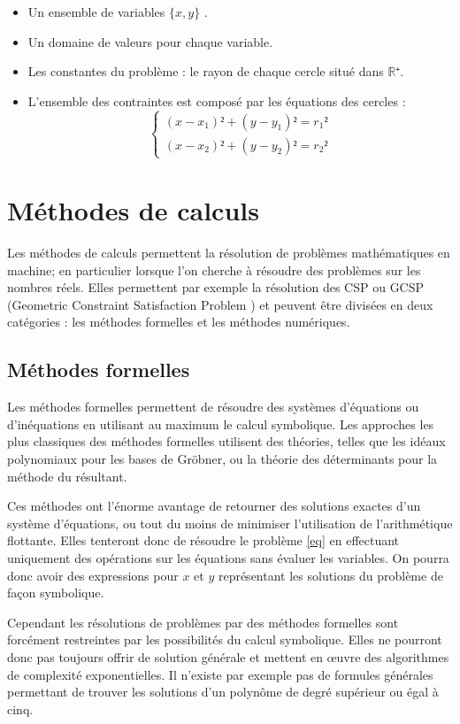 \begin{itemize}
\item
Un ensemble de variables $\{x,y\}$ .
\item
Un domaine de valeurs pour chaque variable. 
\item
Les constantes du problème : le rayon de chaque cercle situé dans  $\mathbb{R⁺}$.
\item
L'ensemble des contraintes est composé par les équations des cercles :
\begin{equation}\label{eq}
\begin{cases}
(x-x_1)²+(y-y_1)² = r_1²\\
(x-x_2)²+(y-y_2)² = r_2²
\end{cases}
\end{equation}
\end{itemize}


\section{Méthodes de calculs}
Les méthodes de calculs permettent la résolution de problèmes mathématiques en machine; en particulier lorsque l'on cherche à résoudre des problèmes sur les nombres réels. Elles permettent par exemple la résolution des \textsc{CSP}  ou \textsc{GCSP} (Geometric Constraint Satisfaction Problem \cite{Jermann}) et peuvent être divisées en deux catégories : les méthodes formelles et les méthodes numériques.


\subsection{Méthodes formelles}
Les méthodes formelles permettent de résoudre des systèmes d'équations ou d'inéquations en utilisant au maximum le calcul symbolique. Les approches les plus classiques des méthodes formelles utilisent des théories, telles que les idéaux polynomiaux pour les bases de Gröbner, ou la théorie des déterminants pour la méthode du résultant.

 Ces méthodes ont l'énorme avantage de retourner des solutions exactes d'un système d'équations, ou tout du moins de minimiser l'utilisation de l'arithmétique flottante. Elles tenteront donc de résoudre le problème \ref{eq} en effectuant uniquement des opérations sur les équations sans évaluer les variables. On pourra donc avoir des expressions pour $x$ et $y$ représentant les solutions du problème de façon symbolique. 

Cependant les résolutions de problèmes par des méthodes formelles sont forcément restreintes par les possibilités du calcul symbolique. Elles ne pourront donc pas toujours offrir de solution générale et mettent en œuvre des algorithmes de complexité exponentielles. Il n'existe par exemple pas de formules générales permettant de trouver les solutions d'un polynôme de degré supérieur ou égal à cinq.


